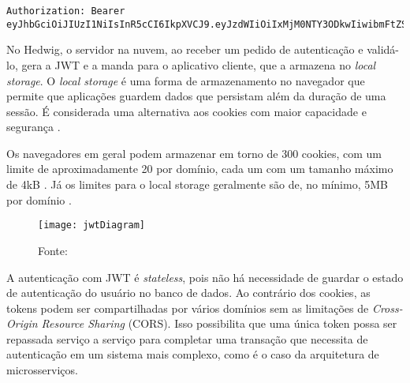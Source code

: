 \begin{lstlisting}
Authorization: Bearer eyJhbGciOiJIUzI1NiIsInR5cCI6IkpXVCJ9.eyJzdWIiOiIxMjM0NTY3ODkwIiwibmFtZSI6IkpvaG4gRG9lIiwiYWRtaW4iOnRydWV9.TJVA95OrM7E2cBab30RMHrHDcEfxjoYZgeFONFh7HgQ
\end{lstlisting}

No Hedwig, o servidor na nuvem, ao receber um pedido de autenticação e validá-lo, gera a JWT e a manda para o aplicativo cliente, que a armazena no \textit{local storage}. O \textit{local storage} é uma forma de armazenamento no navegador que permite que aplicações guardem dados que persistam além da duração de uma sessão. É considerada uma alternativa aos cookies com maior capacidade e segurança \cite{w3cWebStorage}.

Os navegadores em geral podem armazenar em torno de 300 cookies, com um limite de aproximadamente 20 por domínio, cada um com um tamanho máximo de 4kB \cite{cookies}. Já os limites para o local storage geralmente são de, no mínimo, 5MB por domínio \cite{localstorage}.

\begin{figure}[H]
	\centering
	\caption{Diagrama de interação na autenticação por JWT}
  \texttt{[image: jwtDiagram]}
  \caption*{Fonte: \cite{jwt}}
\label{fig:jwtDiagram}
\end{figure}

A autenticação com JWT é \textit{stateless}, pois não há necessidade de guardar o estado de autenticação do usuário no banco de dados. Ao contrário dos cookies, as tokens podem ser compartilhadas por vários domínios sem as limitações de \textit{Cross-Origin Resource Sharing} (CORS). Isso possibilita que uma única token possa ser repassada serviço a serviço para completar uma transação que necessita de autenticação em um sistema mais complexo, como é o caso da arquitetura de microsserviços.
